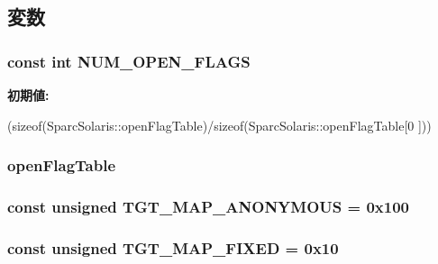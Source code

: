 \subsection{変数}
\hypertarget{classSparcSolaris_ad85b9918c8f2c8739537a002dc1dc526}{
\subsubsection[{NUM\_\-OPEN\_\-FLAGS}]{\setlength{\rightskip}{0pt plus 5cm}const int {\bf NUM\_\-OPEN\_\-FLAGS}}}
\label{classSparcSolaris_ad85b9918c8f2c8739537a002dc1dc526}
{\bfseries 初期値:}
\begin{DoxyCode}

        (sizeof(SparcSolaris::openFlagTable)/sizeof(SparcSolaris::openFlagTable[0
      ]))
\end{DoxyCode}
\hypertarget{classSparcSolaris_ab1db5a531609b99b262cc849ea24765a}{
\subsubsection[{openFlagTable}]{ {\bf openFlagTable}}}
\label{classSparcSolaris_ab1db5a531609b99b262cc849ea24765a}
\hypertarget{classSparcSolaris_a0bbc267200567dd98250b99b6085a499}{
\subsubsection[{TGT\_\-MAP\_\-ANONYMOUS}]{\setlength{\rightskip}{0pt plus 5cm}const unsigned {\bf TGT\_\-MAP\_\-ANONYMOUS} = 0x100}}
\label{classSparcSolaris_a0bbc267200567dd98250b99b6085a499}
\hypertarget{classSparcSolaris_a0124e421d7846143bca15728b7a53e14}{
\subsubsection[{TGT\_\-MAP\_\-FIXED}]{\setlength{\rightskip}{0pt plus 5cm}const unsigned {\bf TGT\_\-MAP\_\-FIXED} = 0x10}}
